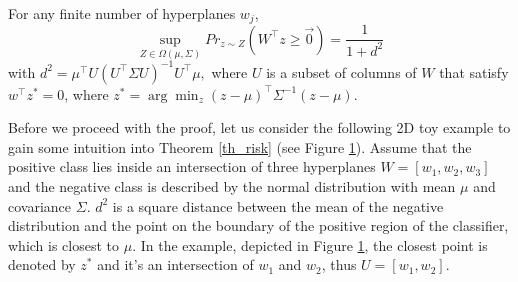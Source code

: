 \documentclass[twoside,11pt]{article}
\begin{document}


\begin{theorem}
\label{th_risk}
For any finite number of hyperplanes $w_j$,
$$\sup_{Z\in\Omega(\mu, \Sigma)}Pr_{z\sim Z}(W^\top z\geq\vec{0})=\frac{1}{1+d^2}$$
with $d^2=\mu^\top U(U^\top \Sigma U)^{-1}U^\top\mu,$
where $U$ is a subset of columns of $W$ that satisfy $w^\top z^*=0$,
where $z^*=\arg\min_z(z-\mu)^\top \Sigma^{-1}(z-\mu).$
\end{theorem}
\begin{figure}[t]
\label{ex_il}
\end{figure}
Before we proceed with the proof, let us consider the following 2D toy example to gain some intuition into Theorem \ref{th_risk} (see Figure \ref{ex_il}). Assume that the positive class lies inside an intersection of three hyperplanes $W=[w_1, w_2, w_3]$ and the negative class is described by the normal distribution with mean $\mu$ and covariance $\Sigma$. $d^2$ is a square distance between the mean of the negative distribution and the point on the boundary of the positive region of the classifier, which is closest to $\mu$. In the example, depicted in Figure \ref{ex_il},  the closest point is denoted by $z^*$ and it's an intersection of $w_1$ and $w_2$, thus  $U=[w_1,w_2]$.
\end{document}
